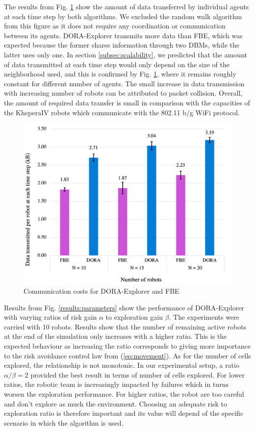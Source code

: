 \documentclass[letterpaper, 10 pt, conference]{ieeeconf}
\begin{document}
The results from Fig. \ref{results:communicationCosts} show the amount
of data transferred by individual agents at each time step by both
algorithms. We excluded the random walk algorithm from this figure as
it does not require any coordination or communication between its
agents. DORA-Explorer transmits more data than FBE, which was expected because
the former shares information through two DBMs, while the latter uses
only one. In section \ref{subsec:scalability}, we predicted that the
amount of data transmitted at each time step would only depend on the
size of the neighborhood used, and this is confirmed by
Fig. \ref{results:communicationCosts}, where it remains roughly
constant for different number of agents. The small increase in data
transmission with increasing number of robots can be attributed to
packet collision. Overall, the amount of required data transfer is
small in comparison with the capacities of the KheperaIV robots which
communicate with the 802.11 b/g WiFi protocol.

\begin{figure}[h]
    \centering
    \includegraphics[width=0.95\columnwidth]{images/communication.png}
    \caption{Communication costs for DORA-Explorer and FBE}
    \label{results:communicationCosts}
\end{figure}

Results from Fig. \ref{results:parameters} show the performance of DORA-Explorer with varying ratios of risk gain $\alpha$ to exploration gain $\beta$. The experiments were carried with 10 robots. Results show that the number of remaining active robots at the end of the simulation only increases with a higher ratio. This is the expected behaviour as increasing the ratio corresponds to giving more importance to the risk avoidance control law from (\ref{eq:movement}). As for the number of cells explored, the relationship is not monotonic. In our experimental setup, a ratio $\alpha / \beta = 2$ provided the best result in terms of number of cells explored. For lower ratios, the robotic team is increasingly impacted by failures which in turns worsen the exploration performance. For higher ratios, the robot are too careful and don't explore as much the environment. Choosing an adequate risk to exploration ratio is therefore important and its value will depend of the specific scenario in which the algorithm is used. 
\end{document}
